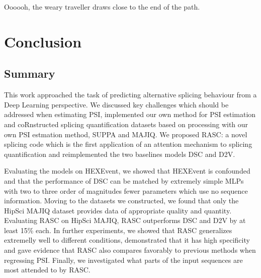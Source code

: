 \begin{savequote}[8cm]
	
	Oooooh, the weary traveller draws close to the end of the path.
\end{savequote}

\chapter{\label{ch:6-conclusion}Conclusion} %
\section{Summary}
This work approached the task of predicting alternative splicing behaviour from a Deep Learning perspective.
We discussed key challenges which should be addressed when estimating PSI, implemented our own method for PSI estimation and coRnstructed splicing quantification datasets based on processing with our own PSI estmation method, SUPPA and MAJIQ. We proposed RASC: a novel splicing code which is the first application of an attention mechanism to splicing quantification and reimplemented the two baselines models DSC and D2V. %

Evaluating the models on HEXEvent, we showed that HEXEvent is confounded and that the performance of DSC can be matched by extremely simple MLPs with two to three order of magnitudes fewer parameters which use no sequence information. 
Moving to the datasets we constructed, we found that only the HipSci MAJIQ dataset provides data of appropriate quality and quantity. Evaluating RASC on HipSci MAJIQ, RASC outperforms DSC and D2V by at least 15\% each. In further experiments, we showed that RASC generalizes extremelly well to different conditions, demonstrated that it has high specificity and gave evidence that RASC also compares favorably to previous methods when regressing PSI. Finally, we investigated what parts of the input sequences are most attended to by RASC.

